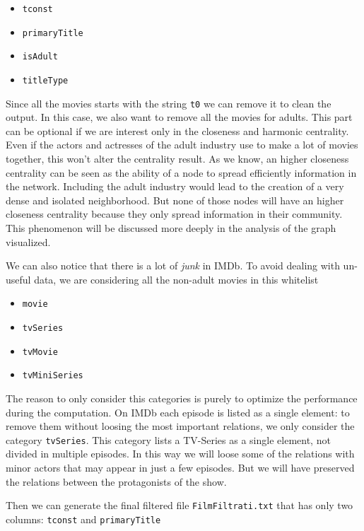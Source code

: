 \begin{itemize}
    \item \texttt{tconst}
    \item \texttt{primaryTitle}
    \item \texttt{isAdult}
    \item \texttt{titleType}
\end{itemize}
Since all the movies starts with the string \texttt{t0} we can remove it to clean the output. In this case, we also want to remove all the movies for adults. This part can be optional if we are interest only in the closeness and harmonic centrality. Even if the actors and actresses of the adult industry use to make a lot of movies together, this won't alter the centrality result. As we know, an higher closeness centrality can be seen as the ability of a node to spread efficiently information in the network. Including the adult industry would lead to the creation of a very dense and isolated neighborhood. But none of those nodes will have an higher closeness centrality because they only spread information in their community. This phenomenon will be discussed more deeply in the analysis of the graph visualized. \s

\noindent We can also notice that there is a lot of \emph{junk} in IMDb. To avoid dealing with un-useful data, we are considering all the non-adult movies in this whitelist

\begin{itemize}
    \item \texttt{movie}
    \item \texttt{tvSeries}
    \item \texttt{tvMovie}
    \item \texttt{tvMiniSeries}
\end{itemize}
The reason to only consider this categories is purely to optimize the performance during the computation. On IMDb each episode is listed as a single element: to remove them without loosing the most important relations, we only consider the category \texttt{tvSeries}. This category lists a TV-Series as a single element, not divided in multiple episodes. In this way we will loose some of the relations with minor actors that may appear in just a few episodes. But we will have preserved the relations between the protagonists of the show. \s

\noindent Then we can generate the final filtered file \texttt{FilmFiltrati.txt} that has only two columns: \texttt{tconst} and \texttt{primaryTitle}

